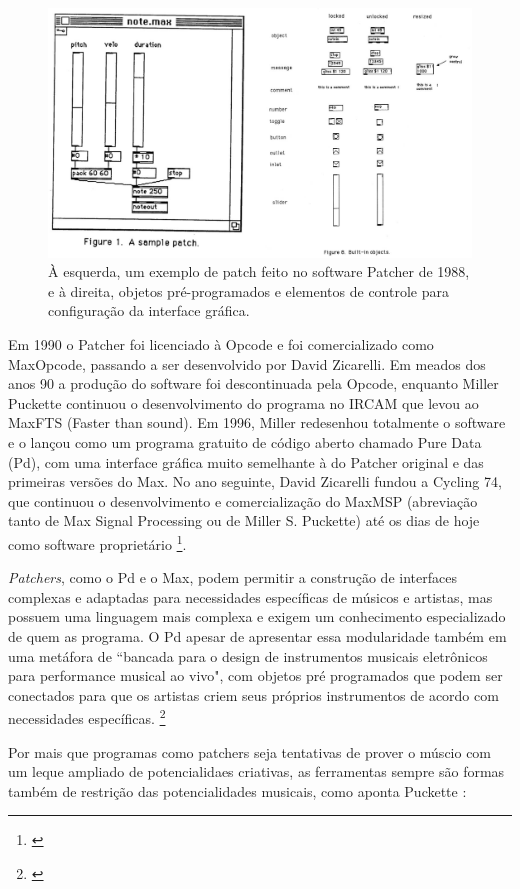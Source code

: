 \begin{figure}
    \caption{\label{patcher}À esquerda, um exemplo de patch feito no software Patcher de 1988, e à direita, objetos pré-programados e elementos de controle para configuração da interface gráfica.}
    
        \includegraphics[width=0.5\linewidth]{pictures/cap2/patcher}
    
\end{figure}


Em 1990 o Patcher foi licenciado à Opcode e foi comercializado como Max\/Opcode, passando a ser desenvolvido por David Zicarelli. Em meados dos anos 90 a produção do software foi descontinuada pela Opcode, enquanto Miller Puckette continuou o desenvolvimento do programa no IRCAM que levou ao Max\/FTS (Faster than sound). Em 1996, Miller redesenhou totalmente o software e o lançou como um programa gratuito de código aberto chamado Pure Data (Pd), com uma interface gráfica muito semelhante à do Patcher original e das primeiras versões do Max. No ano seguinte, David Zicarelli fundou a Cycling 74, que continuou o desenvolvimento e comercialização do Max\/MSP (abreviação tanto de Max Signal Processing ou de Miller S. Puckette) até os dias de hoje como software proprietário \footnote{\cite{Cryer2018}}.


\emph{Patchers}, como o Pd e o Max, podem permitir a construção de interfaces complexas e adaptadas para necessidades específicas de músicos e artistas, mas possuem uma linguagem mais complexa e exigem um conhecimento especializado de quem as programa. O Pd apesar de apresentar essa modularidade também em uma metáfora de ``bancada para o design de instrumentos musicais eletrônicos para performance musical ao vivo", com objetos pré programados que podem ser conectados para que os artistas criem seus próprios instrumentos de acordo com necessidades específicas. \footnote{\cite{PucketteMiller}}
 
Por mais que programas como patchers seja tentativas de prover o múscio com um leque ampliado de potencialidaes criativas, as ferramentas sempre são formas também de restrição das potencialidades musicais, como aponta Puckette \citeyear{PucketteMiller}:

